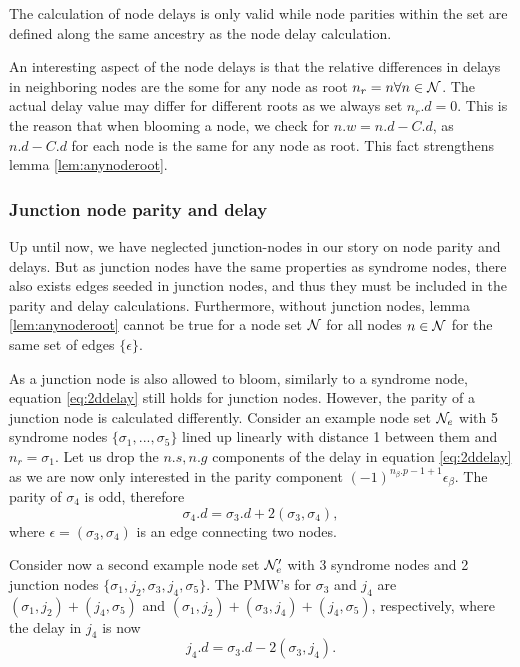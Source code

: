 \begin{lemma}\label{lem:nodecalc_ancestrypath}
 The calculation of node delays is only valid while node parities within the set are defined along the same ancestry as the node delay calculation.
\end{lemma}

An interesting aspect of the node delays is that the relative differences in delays in neighboring nodes are the some for any node as root $n_r = n \forall n \in \mathcal{N}$. The actual delay value may differ for different roots as we always set $n_r.d =0$. This is the reason that when blooming a node, we check for $n.w = n.d - C.d$, as $n.d - C.d$ for each node is the same for any node as root. This fact strengthens lemma \ref{lem:anynoderoot}. 

\subsubsection{Junction node parity and delay}

Up until now, we have neglected junction-nodes in our story on node parity and delays. But as junction nodes have the same properties as syndrome nodes, there also exists edges seeded in junction nodes, and thus they must be included in the parity and delay calculations. Furthermore, without junction nodes, lemma \ref{lem:anynoderoot} cannot be true for a node set $\mathcal{N}$ for all nodes $n \in \mathcal{N}$ for the same set of edges $\{\epsilon\}$.

As a junction node is also allowed to bloom, similarly to a syndrome node, equation \ref{eq:2ddelay} still holds for junction nodes. However, the parity of a junction node is calculated differently. Consider an example node set $\mathcal{N}_e$ with 5 syndrome nodes $\{\sigma_1,...,\sigma_5\}$ lined up linearly with distance 1 between them and $n_r = \sigma_1$. Let us drop the $n.s, n.g$ components of the delay in equation \ref{eq:2ddelay} as we are now only interested in the parity component $(-1)^{n_\beta.p-1+1}\epsilon_\beta$. The parity of $\sigma_4$ is odd, therefore
\begin{equation*}
  \sigma_4.d = \sigma_3.d + 2(\sigma_3, \sigma_4),
\end{equation*}
where $\epsilon = (\sigma_3, \sigma_4)$ is an edge connecting two nodes.

Consider now a second example node set $\mathcal{N}_e'$ with 3 syndrome nodes and 2 junction nodes $\{\sigma_1, j_2, \sigma_3, j_4, \sigma_5\}$. The PMW's for $\sigma_3$ and $j_4$ are $(\sigma_1, j_2) + (j_4, \sigma_5)$ and  $(\sigma_1, j_2) + (\sigma_3, j_4) + (j_4, \sigma_5)$, respectively, where the delay in $j_4$ is now
\begin{equation*}
  j_4.d = \sigma_3.d - 2(\sigma_3, j_4).
\end{equation*}

